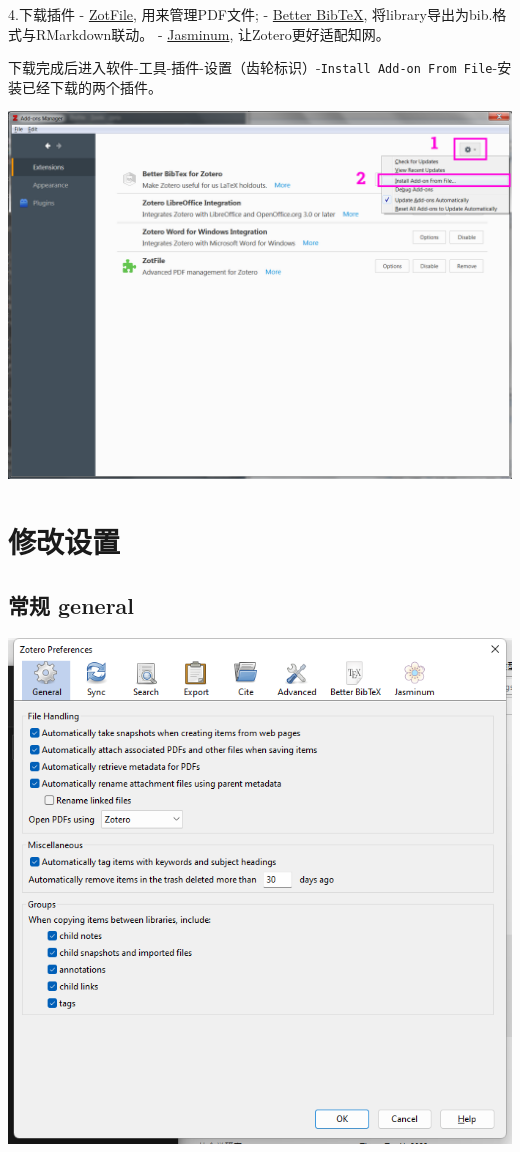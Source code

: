 \documentclass[
  letterpaper,
  DIV=11,
  numbers=noendperiod,
  oneside]{scrreprt}
\begin{document}
4.下载插件 - \href{http://zotfile.com/}{ZotFile}, 用来管理PDF文件; -
\href{https://retorque.re/zotero-better-bibtex/}{Better BibTeX},
将library导出为bib.格式与RMarkdown联动。 -
\href{https://github.com/l0o0/jasminum}{Jasminum},
让Zotero更好适配知网。

下载完成后进入软件-工具-插件-设置（齿轮标识）-\texttt{Install\ Add-on\ From\ File}-安装已经下载的两个插件。

\includegraphics{./images/zotero_plugin.png}

\hypertarget{ux4feeux6539ux8bbeux7f6e}{%
\section{修改设置}\label{ux4feeux6539ux8bbeux7f6e}}

\hypertarget{ux5e38ux89c4-general}{%
\subsection{常规 general}\label{ux5e38ux89c4-general}}

\includegraphics{./images/zotero_general.png}
\end{document}
